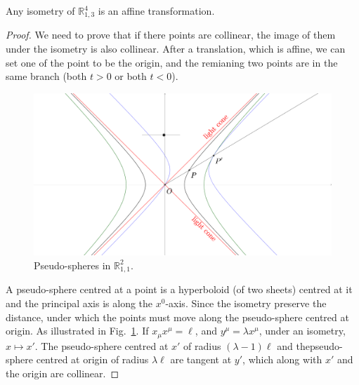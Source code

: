 \documentclass[openany]{book}
\begin{document}
\begin{theorem}
	Any isometry of $\mathbb R^4_{1, 3}$ is an affine transformation.
\end{theorem}
\begin{proof}
	We need to prove that if there points are collinear, the image of them under the isometry is also collinear. 
	After a translation, which is affine, we can set one of the point to be the origin, and the remianing two points are in the same branch (both $t > 0$ or both $t < 0$). 

	\begin{figure}[h]
		\centering
		\includegraphics[width=12cm]{./img/special_reletivity.eps}
		\caption{Pseudo-spheres in $\mathbb R^2_{1,1}$.}
		\label{figure: special relativity}
	\end{figure}

	A pseudo-sphere centred at a point is a hyperboloid (of two sheets) centred at it and the principal axis is along the $x^0$-axis. 
	Since the isometry preserve the distance, under which the points must move along the pseudo-sphere centred at origin.
	As illustrated in Fig.~\ref{figure: special relativity}. 
	If $x_\mu x^\mu = \ell$, and $y^\mu = \lambda x^\mu$, under an isometry, $x \mapsto x'$. 
	The pseudo-sphere centred at $x'$ of radius $(\lambda - 1) \ell$ and thepseudo-sphere centred at origin of radius $\lambda \ell$ are tangent at $y'$, which along with $x'$ and the origin are collinear.	
\end{proof}


\backmatter{}
\nocite{*} %
\printbibliography[heading=bibliography, title={Bibliography}]
\printindex[symbol]

\printindex
\end{document}
